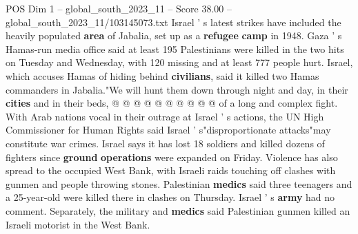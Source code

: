 \begin{textsample}{POS Dim 1 – global\_south\_2023\_11 – Score 38.00 – global\_south\_2023\_11/103145073.txt}
Israel ' s latest strikes have included the heavily populated \textbf{area} of Jabalia, set up as a \textbf{refugee} \textbf{camp} in 1948.
Gaza ' s Hamas-run media office said at least 195 Palestinians were killed in the two hits on Tuesday and Wednesday, with 120 missing and at least 777 people hurt.
Israel, which accuses Hamas of hiding behind \textbf{civilians}, said it killed two Hamas commanders in Jabalia."We will hunt them down through night and day, in their \textbf{cities} and in their beds, @ @ @ @ @ @ @ @ @ @ of a long and complex fight.
With Arab nations vocal in their outrage at Israel ' s actions, the UN High Commissioner for Human Rights said Israel ' s"disproportionate attacks"may constitute war crimes.
Israel says it has lost 18 soldiers and killed dozens of fighters since \textbf{ground} \textbf{operations} were expanded on Friday.
Violence has also spread to the occupied West Bank, with Israeli raids touching off clashes with gunmen and people throwing stones.
Palestinian \textbf{medics} said three teenagers and a 25-year-old were killed there in clashes on Thursday.
Israel ' s \textbf{army} had no comment.
Separately, the military and \textbf{medics} said Palestinian gunmen killed an Israeli motorist in the West Bank.

\end{textsample}
